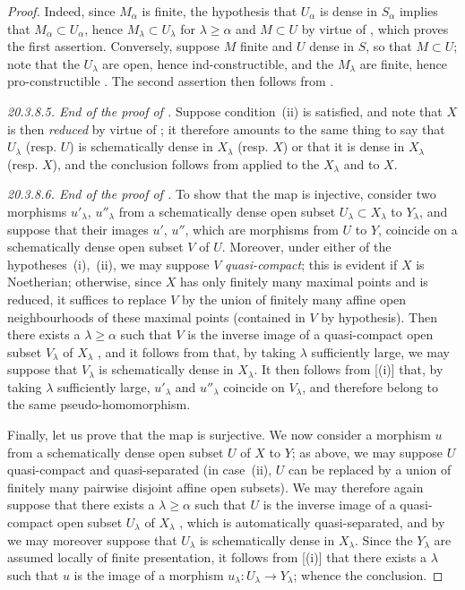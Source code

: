 \begin{proof}
Indeed, since $M_\alpha$ is finite, the hypothesis that $U_\alpha$ is dense in $S_\alpha$ implies that
$M_\alpha\subset U_\alpha$, hence $M_\lambda\subset U_\lambda$ for $\lambda\geq\alpha$ and $M\subset U$ by virtue of , which proves the first assertion.
Conversely, suppose $M$ finite and $U$ dense in $S$, so that $M\subset U$; note that the $U_\lambda$ are open, hence ind-constructible, and the $M_\lambda$ are finite, hence pro-constructible .
The second assertion then follows from .

\emph{20.3.8.5. End of the proof of .}
Suppose condition~(ii) is satisfied, and note that $X$ is then \emph{reduced} by virtue of ; it therefore amounts to the same thing to say that $U_\lambda$ (resp. $U$) is schematically dense in $X_\lambda$ (resp. $X$) or that it is dense in $X_\lambda$ (resp. $X$), and the conclusion follows from  applied to the $X_\lambda$ and to $X$.

\emph{20.3.8.6. End of the proof of .}
To show that the map  is injective, consider two morphisms $u'_\lambda$, $u''_\lambda$ from a schematically dense open subset $U_\lambda\subset X_\lambda$ to $Y_\lambda$, and suppose that their images $u'$, $u''$, which are morphisms from $U$ to $Y$, coincide on a schematically dense open subset $V$ of $U$.
Moreover, under either of the hypotheses~(i),~(ii), we may suppose $V$ \emph{quasi-compact}; this is evident if $X$ is Noetherian; otherwise, since $X$ has only finitely many maximal points and is reduced, it suffices to replace $V$ by the union of finitely many affine open neighbourhoods of these maximal points (contained in $V$ by hypothesis).
Then there exists a $\lambda\geq\alpha$ such that $V$ is the inverse image of a quasi-compact open subset $V_\lambda$ of $X_\lambda$ , and it follows from  that, by taking $\lambda$ sufficiently large, we may suppose that $V_\lambda$ is schematically dense in $X_\lambda$.
It then follows from [(i)] that, by taking $\lambda$ sufficiently large, $u'_\lambda$ and $u''_\lambda$ coincide on $V_\lambda$, and therefore belong to the same pseudo-homomorphism.

Finally, let us prove that the map  is surjective.
We now consider a morphism $u$ from a schematically dense open subset $U$ of $X$ to $Y$; as above, we may suppose $U$ quasi-compact and quasi-separated (in case~(ii), $U$ can be replaced by a union of finitely many pairwise disjoint affine open subsets).
We may therefore again suppose that there exists a $\lambda\geq\alpha$ such that $U$ is the inverse image of a quasi-compact open subset $U_\lambda$ of $X_\lambda$ , which is automatically quasi-separated, and by  we may moreover suppose that $U_\lambda$ is schematically dense in $X_\lambda$.
Since the $Y_\lambda$ are assumed locally of finite presentation, it follows from [(i)] that there exists a $\lambda$ such that $u$ is the image of a morphism $u_\lambda:U_\lambda\to Y_\lambda$; whence the conclusion.


\end{proof}
